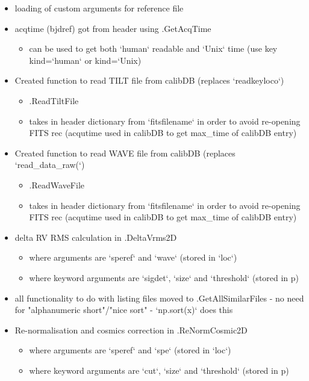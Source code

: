 \begin{itemize}
\item loading of custom arguments for reference file

\item acqtime (bjdref) got from header using \spirouImage.GetAcqTime
	\begin{itemize}
	\item can be used to get both `human` readable and `Unix` time (use key kind=`human` or kind=`Unix)
	\end{itemize}

\item Created function to read TILT file from calibDB (replaces `readkeyloco`)
	\begin{itemize}
	\item \spirouImage.ReadTiltFile
	\item takes in header dictionary from `fitsfilename` in order to avoid re-opening FITS rec (acqutime used in calibDB to get max\_time of calibDB entry) 
	\end{itemize}

\item Created function to read WAVE file from calibDB (replaces `read\_data\_raw(`)
	\begin{itemize}
	\item \spirouImage.ReadWaveFile
	\item takes in header dictionary from `fitsfilename` in order to avoid re-opening FITS rec (acqutime used in calibDB to get max\_time of calibDB entry) 
	\end{itemize}

\item delta RV RMS calculation in \spirouRV.DeltaVrms2D
	\begin{itemize}
	\item where arguments are `speref` and `wave` (stored in `loc`)
	\item where keyword arguments are `sigdet`, `size` and `threshold` (stored in p)
	\end{itemize}

\item all functionality to do with listing files moved to \spirouImage{\hskip 0pt}.GetAllSimilarFiles - no need for "alphanumeric short"/"nice sort" - `np.sort(x)` does this
    
\item Re-normalisation and cosmics correction in \spirouRV.ReNormCosmic2D
	\begin{itemize}
	\item where arguments are `speref` and `spe` (stored in `loc`)
	\item where keyword arguments are `cut`, `size` and `threshold` (stored in p)
	\end{itemize}


\end{itemize}
